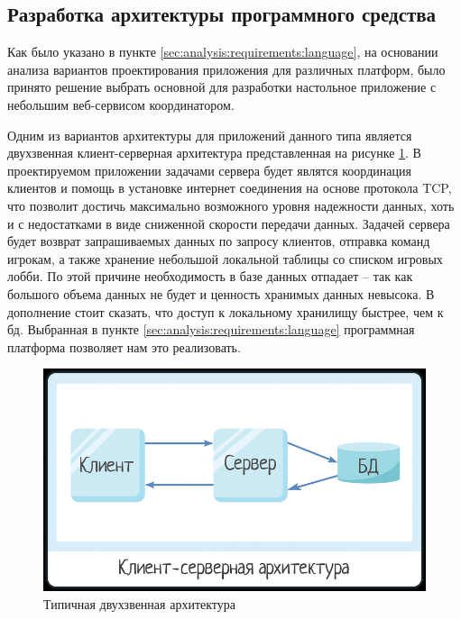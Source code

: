 \subsection{Разработка архитектуры программного средства}
\label{sec:design:architecture}

Как было указано в пункте \ref{sec:analysis:requirements:language}, на основании анализа вариантов проектирования приложения для различных платформ, 
было принято решение выбрать основной для разработки настольное приложение с небольшим веб-сервисом координатором.

Одним из вариантов архитектуры для приложений данного типа является двухзвенная клиент-серверная архитектура представленная на рисунке \ref{sec:design:architecture:client_server}. 
В проектируемом приложении задачами сервера будет являтся координация клиентов и помощь в установке интернет соединения на основе протокола TCP, что позволит достичь максимально
возможного уровня надежности данных, хоть и с недостатками в виде сниженной скорости передачи данных. Задачей сервера будет возврат запрашиваемых данных по запросу клиентов, отправка команд игрокам, а также хранение небольшой локальной таблицы со списком игровых лобби.
По этой причине необходимость в базе данных отпадает -- так как большого объема данных не будет и ценность хранимых данных невысока. В дополнение стоит сказать, что доступ к локальному хранилищу быстрее, чем к бд.
Выбранная в пункте \ref{sec:analysis:requirements:language} программная платформа позволяет нам это реализовать.

\begin{figure}[ht]
\centering
	\includegraphics[scale=0.7]{attachments/client_server.png}
	\caption{Типичная двухзвенная архитектура}
	\label{sec:design:architecture:client_server}
\end{figure}

